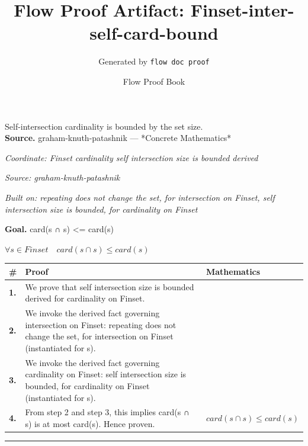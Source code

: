 \documentclass[11pt]{article}
\title{Flow Proof Artifact: Finset-inter-self-card-bound}
\author{Generated by \texttt{flow doc proof}}
\date{Flow Proof Book}
\theoremstyle{definition}
\begin{document}
\maketitle
Self-intersection cardinality is bounded by the set size.\\[0.5em]
\textbf{Source.} graham-knuth-patashnik — *Concrete Mathematics*\\[0.5em]
\bigskip
{}\par
\smallskip\noindent\textit{Coordinate: Finset \cdot cardinality \cdot self intersection size is bounded derived}\par
\smallskip\noindent\textit{Source: graham-knuth-patashnik}\par
\smallskip\noindent\textit{Built on: repeating does not change the set, for intersection on Finset, self intersection size is bounded, for cardinality on Finset}\par
\medskip
\noindent\textbf{Goal.} card(s ∩ s) <= card(s)\par
\noindent$\displaystyle \forall s \in Finset\quad card(s ∩ s) \le card(s)$\par
\medskip
\noindent
\begin{tabular}{@{} >{\raggedright\arraybackslash}p{} >{\raggedright\arraybackslash}p{} >{\raggedleft\arraybackslash}p{} @{}}
\textbf{\#} & \textbf{Proof} & \textbf{Mathematics} \\
\midrule
\textbf{1.} & We prove that self intersection size is bounded derived for cardinality on Finset. & \\[0.45em]
\textbf{2.} & We invoke the derived fact governing intersection on Finset: repeating does not change the set, for intersection on Finset (instantiated for s). & \\[0.45em]
\textbf{3.} & We invoke the derived fact governing cardinality on Finset: self intersection size is bounded, for cardinality on Finset (instantiated for s). & \\[0.45em]
\textbf{4.} & From step 2 and step 3, this implies card(s ∩ s) is at most card(s). Hence proven. & $\displaystyle card(s ∩ s) \le card(s)$ \\[0.45em]
\bottomrule
\end{tabular}
\label{thm:Finset-cardinality-self_intersection_size_is_bounded_derived}
\par\medskip\hrule
\end{document}

